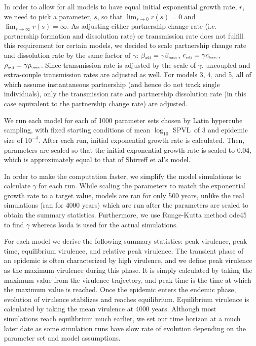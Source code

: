 \documentclass[10pt,letterpaper]{article}
\newcommand{\tsub}[2]{#1_{{\textrm{\tiny #2}}}}
\newcommand{\Lspvl}{$\log_{10}$ SPVL}
\newcommand{\tsub}[2]{#1_{{\textrm{\tiny #2}}}}
\begin{document}
In order to allow for all models to have equal initial exponential growth rate, $r$, we need to pick a parameter, $s$, so that $\lim_{s\to 0} r(s) = 0$ and $\lim_{s\to\infty}  r(s) = \infty$. As adjusting either partnership change rate (i.e. partnership formation and dissolution rate) or transmission rate does not fulfill this requirement for certain models, we decided to scale partnership change rate and dissolution rate by the same factor of $\gamma$: $\tsub{\beta}{adj} =  \gamma \tsub{\beta}{base}$, $\tsub{c}{adj} = \gamma \tsub{c}{base}$, $\tsub{\rho}{adj} = \gamma \tsub{\rho}{base}$. Since transmission rate is adjusted by the scale of $\gamma$, uncoupled and extra-couple transmission rates are adjusted as well. For models 3, 4, and 5, all of which assume instantaneous partnership (and hence do not track single individuals), only the transmission rate and partnership dissolution rate (in this case equivalent to the partnership change rate) are adjusted.

We run each model for each of 1000 parameter sets chosen by Latin hypercube sampling, with fixed starting conditions
of mean \Lspvl\ of 3 and epidemic size of $10^{-4}$. After each run, initial exponential growth rate is calculated. Then, parameters are scaled so that the initial exponential growth rate is scaled to 0.04, which is approximately equal to that of Shirreff et al's model.

In order to make the computation faster, we simplify the model simulations to calculate $\gamma$ for each run. While scaling the parameters to match the exponential growth rate to a target value, models are ran for only 500 years, unlike the real simulations (ran for 4000 years) which are run after the parameters are scaled to obtain the summary statistics. Furthermore, we use Runge-Kutta method ode45 to find $\gamma$ whereas lsoda is used for the actual simulations.

For each model we derive the following summary statistics: peak virulence, peak time, equilibrium virulence, and relative peak virulence. The transient phase of an epidemic is often characterized by high virulence, and we define peak virulence as the maximum virulence during this phase. It is simply calculated by taking the maximum value from the virulence trajectory, and peak time is the time at which the maximum value is reached. Once the epidemic enters the endemic phase, evolution of virulence stabilizes and reaches equilibrium. Equilibrium virulence is calculated by taking the mean virulence at 4000 years. Although most simulations reach equilibrium much earlier, we set our time horizon at a much later date as some simulation runs have slow rate of evolution depending on the parameter set and model assumptions.
\end{document}
